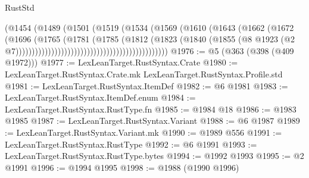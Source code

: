 \begin{lexlean}{RustStd}
\begin{coremodule}
{\begin{coremodule}
{{{{{{{{{{{{{{{{{{{{{{{{{{{{{{{{{{{{{{{{{{{{{{{{{{{{{{                                                          (@1454
                                                            (@1489
                                                              (@1501
                                                                (@1519
                                                                  (@1534
                                                                    (@1569
                                                                      (@1610
                                                                        (@1643
                                                                          (@1662
                                                                            (@1672
                                                                              (@1696
                                                                                (@1765
                                                                                  (@1781
                                                                                    (@1785
                                                                                      (@1812
                                                                                        (@1823
                                                                                          (@1840
                                                                                            (@1855
                                                                                              (@8
                                                                                                @1923
                                                                                                (@2
                                                                                                  @7)))))))))))))))))))))))))))))))))))))))))))))))
@1976 := @5 (@363 (@398 (@409 @1972)))
@1977 := LexLeanTarget.RustSyntax.Crate
@1980 := LexLeanTarget.RustSyntax.Crate.mk LexLeanTarget.RustSyntax.Profile.std
@1981 := LexLeanTarget.RustSyntax.ItemDef
@1982 := @6 @1981
@1983 := LexLeanTarget.RustSyntax.ItemDef.enum
@1984 := LexLeanTarget.RustSyntax.RustType.fn
@1985 := @1984 @18
@1986 := @1983 @1985
@1987 := LexLeanTarget.RustSyntax.Variant
@1988 := @6 @1987
@1989 := LexLeanTarget.RustSyntax.Variant.mk
@1990 := @1989 @556
@1991 := LexLeanTarget.RustSyntax.RustType
@1992 := @6 @1991
@1993 := LexLeanTarget.RustSyntax.RustType.bytes
@1994 := @1992 @1993
@1995 := @2 @1991
@1996 := @1994 @1995
@1998 := @1988 (@1990 @1996)
}}}}}}}}}}}}}}}}}}}}}}}}}}}}}}}}}}}}}}}}}}}}}}}}}}}}}}
\end{coremodule}}
\end{coremodule}
\end{lexlean}
